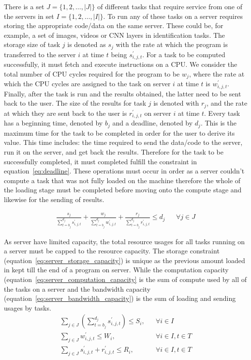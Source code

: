 \documentclass[sotoncolour]{uosproject}     %
\begin{document}
There is a set $J = \{1,2,\ldots,\left| J \right|\}$ of  different tasks that require service from one of the servers
in set $I = \{1,2,\ldots, \left| I \right|\}$. To run any of these tasks on a server requires storing the appropriate
code/data on the same server. These could be, for example, a set of images, videos or CNN layers in identification
tasks. The storage size of task $j$ is denoted as $s_j$ with the rate at which the program is transferred to the server
$i$ at time $t$ being $s^{'}_{i,j,t}$. For a task to be computed successfully, it must fetch and execute instructions
on a CPU. We consider the total number of CPU cycles required for the program to be $w_j$, where the rate at which the
CPU cycles are assigned to the task on server $i$ at time $t$ is $w^{'}_{i,j,t}$. Finally, after the task is run and
the results obtained, the latter need to be sent back to the user. The size of the results for task $j$ is denoted with
$r_j$, and the rate at which they are sent back to the user is $r^{'}_{i,j,t}$ on server $i$ at time $t$. Every task
has a beginning time, denoted by $b_j$ and a deadline, denoted by $d_j$. This is the maximum time for the task to be
completed in order for the user to derive its value. This time includes: the time required to send the data/code to the
server, run it on the server, and get back the results. Therefore for the task to be successfully completed, it must
completed fulfill the constraint in equation~\eqref{eq:deadline}. These operations must occur in order as a server
couldn't compute a task that was not fully loaded on the machine therefore the whole of the loading stage must be
completed before moving onto the compute stage and likewise for the sending of results.

\begin{align}
    \frac{s_j}{\sum^{d_j}_{t=b_j} s^{'}_{i,j,t}} + \frac{w_j}{\sum^{d_j}_{t=b_j} w^{'}_{i,j,t}}  +
    \frac{r_j}{\sum^{d_j}_{t=b_j} r^{'}_{i,j,t}} \leq d_j && \forall{j \in J}  \label{eq:deadline}
\end{align}

As server have limited capacity, the total resource usages for all tasks running on a server must be capped to the
resource capacity. The storage constraint (equation~\eqref{eq:server_storage_capacity}) is unique as the previous amount
loaded in kept till the end of a program on server. While the computation capacity
(equation~\eqref{eq:server_computation_capacity} is the sum of compute used by all of the tasks on a server and the
bandwidth capacity (equation~\eqref{eq:server_bandwidth_capacity}) is the sum of loading and sending usages by tasks.
\begin{align}
    \sum_{j \in J} \left(\sum^{d_j}_{t=b_j} s^{'}_{i,j,t} \right) \leq S_i, && \forall{i \in I} \label{eq:server_storage_capacity} \\
    \sum_{j \in J} w^{'}_{i,j,t} \leq W_i, && \forall{i \in I, t \in T} \label{eq:server_computation_capacity} \\
    \sum_{j \in J} s^{'}_{i,j,t} + r^{'}_{i,j,t} \leq R_i, && \forall{i \in I, t \in T} \label{eq:server_bandwidth_capacity} \\
\end{align}
\end{document}
